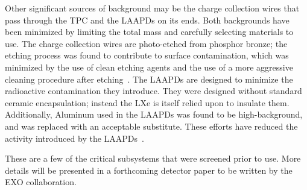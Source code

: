 Other significant sources of background may be the charge collection wires that pass through the TPC and the LAAPDs on its ends.  Both backgrounds have been minimized by limiting the total mass and carefully selecting materials to use.  The charge collection wires are photo-etched from phosphor bronze; the etching process was found to contribute to surface contamination, which was minimized by the use of clean etching agents and the use of a more aggressive cleaning procedure after etching~\cite{MaterialsCatalog}.  The LAAPDs are designed to minimize the radioactive contamination they introduce.  They were designed without standard ceramic encapsulation; instead the LXe is itself relied upon to insulate them.  Additionally, Aluminum used in the LAAPDs was found to be high-background, and was replaced with an acceptable substitute.  These efforts have reduced the activity introduced by the LAAPDs~\cite{MaterialsCatalog}\cite{EXOLAAPD}.

These are a few of the critical subsystems that were screened prior to use.  More details will be presented in a forthcoming detector paper to be written by the EXO collaboration.
